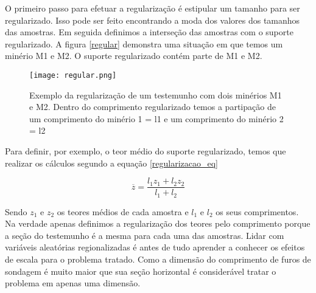 O primeiro passo para efetuar a regularização é estipular um tamanho para ser regularizado. Isso pode ser feito encontrando a moda dos valores dos tamanhos das amostras. Em seguida definimos a interseção das amostras com o suporte regularizado. A figura \eqref{regular} demonstra uma situação em que temos um minério M1 e M2. O suporte regularizado contém parte de M1 e M2.
   
\begin{figure}[H]
	\centering
	\texttt{[image: regular.png]}	
	\caption{Exemplo da regularização de um testemunho com dois minérios M1 e M2. Dentro do comprimento regularizado temos a partipação de um comprimento do minério 1 = l1 e um comprimento do minério 2 = l2 }
	\label{regular}
\end{figure}

Para definir, por exemplo, o teor médio do suporte regularizado, temos que realizar os cálculos segundo a equação \eqref{regularizacao_eq}

\begin{equation}\label{regularizacao_eq}
 \overline{z} = \frac{l_{1}z_{1} + l_{2}z_{2}}{l_{1}+l_{2}}
\end{equation}

Sendo $z_{1}$ e $z_{2}$ os teores médios de cada amostra e $l_{1}$ e $l_{2}$ os seus comprimentos. Na verdade apenas definimos a regularização dos teores pelo comprimento porque a seção do testemunho é a mesma para cada uma das amostras. Lidar com variáveis aleatórias regionalizadas é antes de tudo aprender a conhecer os efeitos de escala para o problema tratado. Como a dimensão do comprimento de furos de sondagem é muito maior que sua seção horizontal é considerável tratar o problema em apenas uma dimensão.


